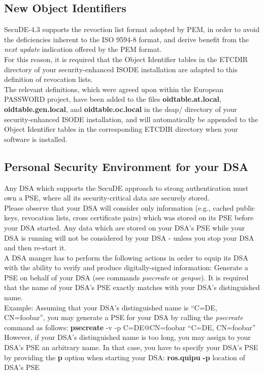 \subsection{New Object Identifiers}
SecuDE-4.3 supports the revoction list format adopted 
by PEM, in order to avoid the deficiencies inherent to the ISO 9594-8 format,
and derive benefit from the {\em next update} indication offered by the PEM format. 
\\ [1em]
For this reason, it is required that the Object Identifier tables in the ETCDIR directory
of your security-enhanced ISODE installation are adapted to this definition of revocation lists.
\\ [1em]
The relevant definitions, which were agreed upon within the European PASSWORD project, have been 
added to the files {\bf oidtable.at.local}, 
{\bf oidtable.gen.local}, and {\bf oidtable.oc.local} in the dsap/ directory of your 
security-enhanced ISODE installation, and will automatically be appended to the Object Identifier 
tables in the corresponding ETCDIR directory when your software is
installed. 


\subsection{Personal Security Environment for your DSA}
Any DSA which supports the SecuDE approach to strong authentication
must own a PSE, where all its security-critical data are securely 
stored.
\\ [1em]
Please observe that your DSA will consider only information (e.g., cached
public keys, revocation lists, cross certificate pairs) which was
stored on its PSE before your DSA started. Any data which are stored on your
DSA's PSE while your DSA is running will not be considered by your DSA - unless
you stop your DSA and then re-start it.
\\ [1em]
A DSA manger has to perform the following actions in order to equip
its DSA with the ability to verify and produce digitally-signed 
information:
\be
\m Generate a PSE on behalf of your DSA (see commands {\em psecreate} or {\em genpse}).
   It is required that the name of your DSA's PSE exactly matches with your DSA's distinguished name.
   \\ [1em]
   Example: Assuming that your DSA's distinguished name is ``C=DE, CN=foobar'', you may generate a PSE
   for your DSA by calling the {\em psecreate} command as follows:
   \bvtab
   \1 {\bf psecreate} -v -p C=DE@CN=foobar ``C=DE, CN=foobar''\\
   \evtab
   However, if your DSA's distinguished name is too long, you may assign to your DSA's PSE
   an arbitrary name. In that case, you have to specify your DSA's PSE by providing the {\bf p} 
   option when starting your DSA:
   \bvtab
   \1 {\bf ros.quipu} {\bf -p} location of DSA's PSE \\
   \evtab


